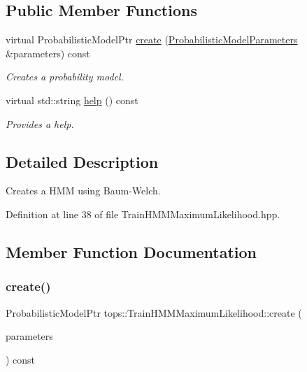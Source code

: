 \subsection*{Public Member Functions}
\begin{DoxyCompactItemize}
\item 
virtual Probabilistic\+Model\+Ptr \hyperlink{classtops_1_1TrainHMMMaximumLikelihood_a70881378e3f71eba8683df6e5e3d0433}{create} (\hyperlink{classtops_1_1ProbabilisticModelParameters}{Probabilistic\+Model\+Parameters} \&parameters) const
\begin{DoxyCompactList}\small\item\em Creates a probability model. \end{DoxyCompactList}\item 
\mbox{\label{classtops_1_1TrainHMMMaximumLikelihood_a26826dc0cd793cf5d026a4d8b6daa8fc}} 
virtual std\+::string \hyperlink{classtops_1_1TrainHMMMaximumLikelihood_a26826dc0cd793cf5d026a4d8b6daa8fc}{help} () const
\begin{DoxyCompactList}\small\item\em Provides a help. \end{DoxyCompactList}\end{DoxyCompactItemize}


\subsection{Detailed Description}
Creates a H\+MM using Baum-\/\+Welch. 

Definition at line 38 of file Train\+H\+M\+M\+Maximum\+Likelihood.\+hpp.



\subsection{Member Function Documentation}
\mbox{\label{classtops_1_1TrainHMMMaximumLikelihood_a70881378e3f71eba8683df6e5e3d0433}} 
\subsubsection{\texorpdfstring{create()}{create()}}
{\footnotesize\ttfamily Probabilistic\+Model\+Ptr tops\+::\+Train\+H\+M\+M\+Maximum\+Likelihood\+::create (\begin{DoxyParamCaption}\item[{\hyperlink{classtops_1_1ProbabilisticModelParameters}{Probabilistic\+Model\+Parameters} \&}]{parameters }\end{DoxyParamCaption}) const\hspace{0.3cm}{\ttfamily [virtual]}}




